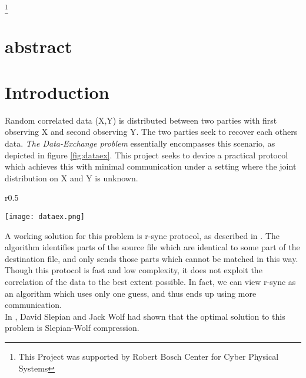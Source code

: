 \documentclass[
11pt, %
a4paper, %
oneside, %
headinclude,footinclude, %
BCOR5mm, %
]{scrartcl}
\begin{document}
\pagestyle{scrheadings} %


\newpage
\maketitle %


\setcounter{tocdepth}{2} %

\tableofcontents %
\listoffigures
\footnote{This Project was supported by Robert Bosch Center for Cyber Physical Systems}
\newpage
\section*{abstract}

\newpage
\section{Introduction}\label{intro}
Random correlated data (X,Y) is distributed between two parties with first observing X and second observing Y. The two parties seek to recover each others data. \emph{The Data-Exchange problem} essentially encompasses this scenario, as depicted in figure \ref{fig:dataex}. This project seeks to device a practical protocol which achieves this with minimal communication under a setting where the joint distribution on X and Y is unknown.\\
\begin{wrapfigure}{r}{0.5\textwidth}
  \begin{center}
    \texttt{[image: dataex.png]}
  \end{center}
  \caption{The Data-Exchange Problem}
  \label{fig:dataex}
\end{wrapfigure}
A working solution for this problem is r-sync protocol, as described in   \cite{rsync}. The algorithm identifies parts of the source file which are identical to some part of the destination file, and only sends those parts which cannot be matched in this way. Though this protocol is fast and low complexity, it does not exploit the correlation of the data to the best extent possible. In fact, we can view r-sync as an algorithm which uses only one guess, and thus ends up using more communication.\\
In \cite{sw}, David Slepian and Jack Wolf had shown that the optimal solution to this problem is Slepian-Wolf compression. 
\end{document}
